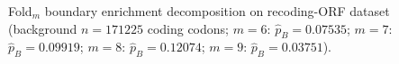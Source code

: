Fold$_m$ boundary enrichment decomposition on recoding-ORF dataset (background $n=171225$ coding codons; $m=6$: $\widehat{p}_B=0.07535$; $m=7$: $\widehat{p}_B=0.09919$; $m=8$: $\widehat{p}_B=0.12074$; $m=9$: $\widehat{p}_B=0.03751$).
